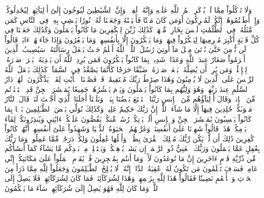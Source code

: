 وَلَا تَأۡكُلُواْ مِمَّا لَمۡ يُذۡكَرِ ٱسۡمُ ٱللَّهِ عَلَيۡهِ وَإِنَّهُۥ لَفِسۡقٞۗ وَإِنَّ ٱلشَّيَٰطِينَ لَيُوحُونَ إِلَىٰٓ أَوۡلِيَآئِهِمۡ لِيُجَٰدِلُوكُمۡۖ وَإِنۡ أَطَعۡتُمُوهُمۡ إِنَّكُمۡ لَمُشۡرِكُونَ
أَوَمَن كَانَ مَيۡتٗا فَأَحۡيَيۡنَٰهُ وَجَعَلۡنَا لَهُۥ نُورٗا يَمۡشِي بِهِۦ فِي ٱلنَّاسِ كَمَن مَّثَلُهُۥ فِي ٱلظُّلُمَٰتِ لَيۡسَ بِخَارِجٖ مِّنۡهَاۚ كَذَٰلِكَ زُيِّنَ لِلۡكَٰفِرِينَ مَا كَانُواْ يَعۡمَلُونَ
وَكَذَٰلِكَ جَعَلۡنَا فِي كُلِّ قَرۡيَةٍ أَكَٰبِرَ مُجۡرِمِيهَا لِيَمۡكُرُواْ فِيهَاۖ وَمَا يَمۡكُرُونَ إِلَّا بِأَنفُسِهِمۡ وَمَا يَشۡعُرُونَ
وَإِذَا جَآءَتۡهُمۡ ءَايَةٞ قَالُواْ لَن نُّؤۡمِنَ حَتَّىٰ نُؤۡتَىٰ مِثۡلَ مَآ أُوتِيَ رُسُلُ ٱللَّهِۘ ٱللَّهُ أَعۡلَمُ حَيۡثُ يَجۡعَلُ رِسَالَتَهُۥۗ سَيُصِيبُ ٱلَّذِينَ أَجۡرَمُواْ صَغَارٌ عِندَ ٱللَّهِ وَعَذَابٞ شَدِيدُۢ بِمَا كَانُواْ يَمۡكُرُونَ
فَمَن يُرِدِ ٱللَّهُ أَن يَهۡدِيَهُۥ يَشۡرَحۡ صَدۡرَهُۥ لِلۡإِسۡلَٰمِۖ وَمَن يُرِدۡ أَن يُضِلَّهُۥ يَجۡعَلۡ صَدۡرَهُۥ ضَيِّقًا حَرَجٗا كَأَنَّمَا يَصَّعَّدُ فِي ٱلسَّمَآءِۚ كَذَٰلِكَ يَجۡعَلُ ٱللَّهُ ٱلرِّجۡسَ عَلَى ٱلَّذِينَ لَا يُؤۡمِنُونَ
وَهَٰذَا صِرَٰطُ رَبِّكَ مُسۡتَقِيمٗاۗ قَدۡ فَصَّلۡنَا ٱلۡأٓيَٰتِ لِقَوۡمٖ يَذَّكَّرُونَ
۞لَهُمۡ دَارُ ٱلسَّلَٰمِ عِندَ رَبِّهِمۡۖ وَهُوَ وَلِيُّهُم بِمَا كَانُواْ يَعۡمَلُونَ
وَيَوۡمَ يَحۡشُرُهُمۡ جَمِيعٗا يَٰمَعۡشَرَ ٱلۡجِنِّ قَدِ ٱسۡتَكۡثَرۡتُم مِّنَ ٱلۡإِنسِۖ وَقَالَ أَوۡلِيَآؤُهُم مِّنَ ٱلۡإِنسِ رَبَّنَا ٱسۡتَمۡتَعَ بَعۡضُنَا بِبَعۡضٖ وَبَلَغۡنَآ أَجَلَنَا ٱلَّذِيٓ أَجَّلۡتَ لَنَاۚ قَالَ ٱلنَّارُ مَثۡوَىٰكُمۡ خَٰلِدِينَ فِيهَآ إِلَّا مَا شَآءَ ٱللَّهُۚ إِنَّ رَبَّكَ حَكِيمٌ عَلِيمٞ
وَكَذَٰلِكَ نُوَلِّي بَعۡضَ ٱلظَّـٰلِمِينَ بَعۡضَۢا بِمَا كَانُواْ يَكۡسِبُونَ
يَٰمَعۡشَرَ ٱلۡجِنِّ وَٱلۡإِنسِ أَلَمۡ يَأۡتِكُمۡ رُسُلٞ مِّنكُمۡ يَقُصُّونَ عَلَيۡكُمۡ ءَايَٰتِي وَيُنذِرُونَكُمۡ لِقَآءَ يَوۡمِكُمۡ هَٰذَاۚ قَالُواْ شَهِدۡنَا عَلَىٰٓ أَنفُسِنَاۖ وَغَرَّتۡهُمُ ٱلۡحَيَوٰةُ ٱلدُّنۡيَا وَشَهِدُواْ عَلَىٰٓ أَنفُسِهِمۡ أَنَّهُمۡ كَانُواْ كَٰفِرِينَ
ذَٰلِكَ أَن لَّمۡ يَكُن رَّبُّكَ مُهۡلِكَ ٱلۡقُرَىٰ بِظُلۡمٖ وَأَهۡلُهَا غَٰفِلُونَ
وَلِكُلّٖ دَرَجَٰتٞ مِّمَّا عَمِلُواْۚ وَمَا رَبُّكَ بِغَٰفِلٍ عَمَّا يَعۡمَلُونَ
وَرَبُّكَ ٱلۡغَنِيُّ ذُو ٱلرَّحۡمَةِۚ إِن يَشَأۡ يُذۡهِبۡكُمۡ وَيَسۡتَخۡلِفۡ مِنۢ بَعۡدِكُم مَّا يَشَآءُ كَمَآ أَنشَأَكُم مِّن ذُرِّيَّةِ قَوۡمٍ ءَاخَرِينَ
إِنَّ مَا تُوعَدُونَ لَأٓتٖۖ وَمَآ أَنتُم بِمُعۡجِزِينَ
قُلۡ يَٰقَوۡمِ ٱعۡمَلُواْ عَلَىٰ مَكَانَتِكُمۡ إِنِّي عَامِلٞۖ فَسَوۡفَ تَعۡلَمُونَ مَن تَكُونُ لَهُۥ عَٰقِبَةُ ٱلدَّارِۚ إِنَّهُۥ لَا يُفۡلِحُ ٱلظَّـٰلِمُونَ
وَجَعَلُواْ لِلَّهِ مِمَّا ذَرَأَ مِنَ ٱلۡحَرۡثِ وَٱلۡأَنۡعَٰمِ نَصِيبٗا فَقَالُواْ هَٰذَا لِلَّهِ بِزَعۡمِهِمۡ وَهَٰذَا لِشُرَكَآئِنَاۖ فَمَا كَانَ لِشُرَكَآئِهِمۡ فَلَا يَصِلُ إِلَى ٱللَّهِۖ وَمَا كَانَ لِلَّهِ فَهُوَ يَصِلُ إِلَىٰ شُرَكَآئِهِمۡۗ سَآءَ مَا يَحۡكُمُونَ
